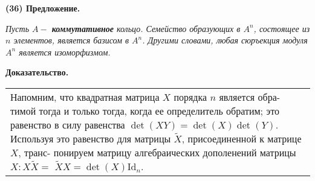 \documentclass{mai_book}
\begin{document}
	\noindent
	{\bf (36) Предложение.}
	
	{\it Пусть $A - $ {\bf коммутативное} кольцо. Семейство образующих в $A^n$,\linebreak
	состоящее из $n$ элементов, является базисом в $A^n$. Другими словами,\linebreak
	любая сюръекция модуля $A^n$ является изоморфизмом.}
	
	\noindent
	{\bf Доказательство.}
	
	\begin{tabular}{|p{13cm}}
	\noindent
	Напомним, что квадратная матрица $X$ порядка $n$ является обра-\linebreak
	тимой тогда и только тогда, когда ее определитель обратим; это\linebreak
	равенство в силу равенства $\det(XY) = \det(X)\det(Y)$. Используя это\linebreak
	равенство для матрицы $\widetilde{X}$, присоединенной к матрице $X$, транс-\linebreak
	понируем матрицу алгебраических дополенений матрицы $X: X\widetilde{X} = $\linebreak
	$\widetilde{X}X = \det(X) \text{Id}_n$.
	\end{tabular}
	
	\pagebreak
	
	
\end{document}
